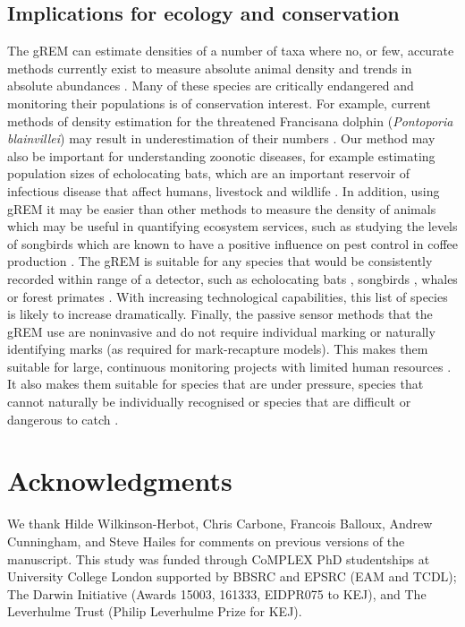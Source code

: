 \documentclass[a4paper,10pt,reqno,oneside]{amsart}
\begin{document}
\subsection*{Implications for ecology and conservation}
The gREM can estimate densities of a number of taxa where no, or few, accurate methods currently exist to measure absolute animal density and trends in absolute abundances \citep{thomas2012passive}. Many of these species are critically endangered and monitoring their populations is of conservation interest. For example, current methods of density estimation for the threatened Francisana dolphin (\emph{Pontoporia blainvillei}) may result in underestimation of their numbers \citep{crespo2010abundance}. Our method may also be important for understanding zoonotic diseases, for example estimating population sizes of echolocating bats, which are an important reservoir of infectious disease that affect humans, livestock and wildlife \citep{calisher2006bats}. In addition, using gREM it may be easier than other methods to measure the density of animals which may be useful in quantifying ecosystem services, such as studying the levels of songbirds which are known to have a positive influence on pest control in coffee production \citep{jirinec2011roosting}. The gREM is suitable for any species that would be consistently recorded within range of a detector, such as echolocating bats \citep{kunz2009methods}, songbirds \citep{buckland2006point}, whales \citep{marques2009estimating} or forest primates \citep{hassel2008reliable}. With increasing technological capabilities, this list of species is likely to increase dramatically. Finally, the passive sensor methods that the gREM use are noninvasive and do not require individual marking \citep{jewell2013effect} or naturally identifying marks (as required for mark-recapture models). This makes them suitable for large, continuous monitoring projects with limited human resources \citep{kelly2012noninvasive}. It also makes them suitable for species that are under pressure, species that cannot naturally be individually recognised or species that are difficult or dangerous to catch \citep{thomas2012passive}.


\section*{Acknowledgments}
We thank Hilde Wilkinson-Herbot, Chris Carbone, Francois Balloux, Andrew Cunningham, and Steve Hailes for comments on previous versions of the manuscript. This study was funded through CoMPLEX PhD studentships at University College London supported by BBSRC and EPSRC (EAM and TCDL); The Darwin Initiative (Awards 15003, 161333, EIDPR075 to KEJ), and The Leverhulme Trust (Philip Leverhulme Prize for KEJ).

	
	
\end{document}
